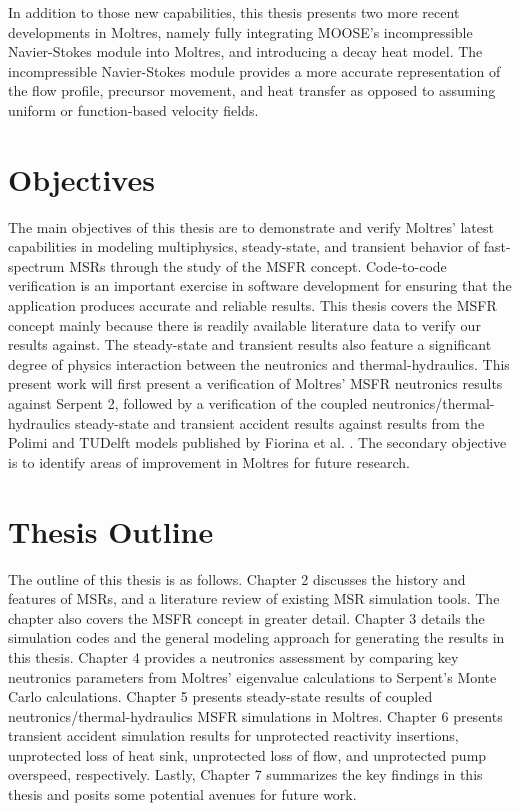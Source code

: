 In addition to those new capabilities, this thesis presents two more recent
developments in Moltres, namely fully integrating \gls{MOOSE}'s incompressible
Navier-Stokes module into Moltres, and introducing a
decay heat model. The incompressible Navier-Stokes module provides a more
accurate representation of the flow profile, precursor movement, and heat
transfer as opposed to assuming uniform or function-based velocity fields. 

\section{Objectives}

The main objectives of this thesis are to demonstrate and verify Moltres'
latest capabilities in modeling multiphysics, steady-state, and transient
behavior of fast-spectrum \glspl{MSR} through the study of the \gls{MSFR}
concept. Code-to-code verification is an important exercise in software
development for ensuring that the application produces accurate and reliable
results. This thesis covers the \gls{MSFR} concept mainly because 
there is readily available literature data to verify our results against. The
steady-state and transient results also feature a significant degree of
physics interaction between the neutronics and thermal-hydraulics. This
present work will first present a verification of Moltres' \gls{MSFR}
neutronics results against Serpent 2, followed by a verification of
the coupled neutronics/thermal-hydraulics steady-state and transient accident
results against results from the Polimi and TUDelft models published by
Fiorina et al. \cite{fiorina_modelling_2014}. The
secondary objective is to identify areas of improvement in Moltres for future
research.

\section{Thesis Outline}

The outline of this thesis is as follows. Chapter 2 discusses the history and
features of \glspl{MSR}, and a literature review of existing \gls{MSR}
simulation tools. The chapter also covers the \gls{MSFR} concept in greater
detail. Chapter 3 details the simulation codes and the general modeling
approach for generating the results in this thesis. Chapter 4 provides a
neutronics assessment by comparing key neutronics parameters from Moltres'
eigenvalue calculations to Serpent's Monte Carlo calculations. Chapter 5
presents steady-state results of coupled neutronics/thermal-hydraulics
\gls{MSFR} simulations in Moltres. Chapter 6 presents transient accident
simulation results for unprotected reactivity insertions, unprotected loss of
heat sink, unprotected loss of flow, and unprotected pump overspeed,
respectively. Lastly, Chapter 7 summarizes the key findings in this thesis
and posits some potential avenues for future work.
